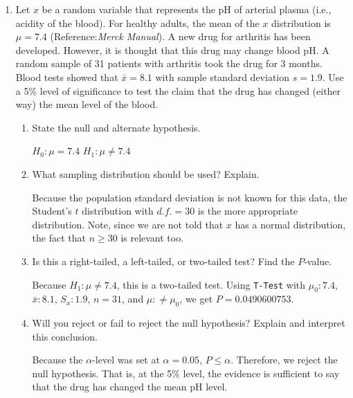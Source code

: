 \documentclass{article}
\newcommand{\answer}[1]{\color{red}#1}
\begin{document}
\pagestyle{myheadings}

\begin{center}
\textbf{}
\end{center}


\begin{enumerate}

\item Let $x$ be a random variable that represents the pH of arterial plasma (i.e., acidity of the blood). For healthy adults, the mean of the $x$ distribution is $\mu = 7.4$ (Reference:{\em Merck Manual}). A new drug for arthritis has been developed. However, it is thought that this drug may change blood pH. A random sample of 31 patients with arthritis took the drug for 3 months. Blood tests showed that $\bar{x} = 8.1$ with sample standard deviation $s=1.9$. Use a 5\% level of significance to test the claim that the drug has changed (either way) the mean level of the blood.

	\begin{enumerate}
	\item State the null and alternate hypothesis.  
	
	{\answer $H_0 : \mu = 7.4$  
	$H_1: \mu \neq 7.4$} 
	 

	\item What sampling distribution should be used? Explain.  
	
	{\answer Because the population standard deviation is not known for this data, the Student's $t$ distribution with $d.f.=30$ is the more appropriate distribution. Note, since we are not told that $x$ has a normal distribution, the fact that $n \geq 30$ is relevant too.}  
	
	\item Is this a right-tailed, a left-tailed, or two-tailed test? Find the $P$-value.  
	
	{\answer Because $H_1: \mu \neq 7.4$, this is a two-tailed test.  
	Using \texttt{T-Test} with $\mu_0: 7.4$, $\bar{x}: 8.1$, $S_x: 1.9$, $n=31$, and $\mu: \neq \mu_0$, we get $P = 0.0490600753$.} 
	 
	
	\item Will you reject or fail to reject the null hypothesis? Explain and interpret this conclusion.  
	
	{\answer Because the $\alpha$-level was set at $\alpha = 0.05$, $P \leq \alpha$. Therefore, we reject the null hypothesis. That is, at the 5\% level, the evidence is sufficient to say that the drug has changed the mean pH level.} 
	 

\end{enumerate}
\end{enumerate}
\end{document}
